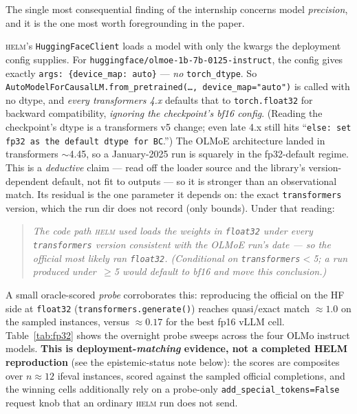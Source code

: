 \documentclass[11pt]{report}
\newcommand{\code}[1]{\texttt{#1}}
\begin{document}
The single most consequential finding of the internship concerns model
\emph{precision}, and it is the one most worth foregrounding in the paper.

\textsc{helm}'s \code{HuggingFaceClient} loads a model with only the kwargs the
deployment config supplies. For \code{huggingface/olmoe-1b-7b-0125-instruct}, the
config gives exactly \code{args: \{device\_map: auto\}} --- \emph{no}
\code{torch\_dtype}. So \code{AutoModelForCausalLM.from\_pretrained(\ldots,
device\_map="auto")} is called with no dtype, and \emph{every transformers 4.x}
defaults that to \code{torch.float32} for backward compatibility, \emph{ignoring
the checkpoint's bf16 config}. (Reading the checkpoint's dtype is a transformers
v5 change; even late 4.x still hits ``\code{else: set fp32 as the default dtype for
BC}.'') The OLMoE architecture landed in transformers $\sim$4.45, so a January-2025
run is squarely in the fp32-default regime. This is a \emph{deductive} claim ---
read off the loader source and the library's version-dependent default, not fit to
outputs --- so it is stronger than an observational match. Its residual is the one
parameter it depends on: the exact \code{transformers} version, which the run dir
does not record (only bounds). Under that reading:

\begin{quote}\itshape
The code path \textsc{helm} used loads the weights in \code{float32} under every
\code{transformers} version consistent with the OLMoE run's date --- so the
official most likely ran \code{float32}. (Conditional on \code{transformers}$<$5;
a run produced under \,$\geq$5 would default to bf16 and move this conclusion.)
\end{quote}

A small oracle-scored \emph{probe} corroborates this: reproducing the official on
the HF side at \code{float32} (\code{transformers.generate()}) reaches quasi/exact
match $\approx 1.0$ on the sampled instances, versus $\approx 0.17$ for the best
fp16 vLLM cell. Table~\ref{tab:fp32} shows the overnight probe sweeps across the
four OLMo instruct models. \textbf{This is deployment-\emph{matching} evidence, not
a completed HELM reproduction} (see the epistemic-status note below): the scores are
composites over $n\approx12$ ifeval instances, scored against the sampled official
completions, and the winning cells additionally rely on a probe-only
\code{add\_special\_tokens=False} request knob that an ordinary \textsc{helm} run
does not send.
\end{document}
